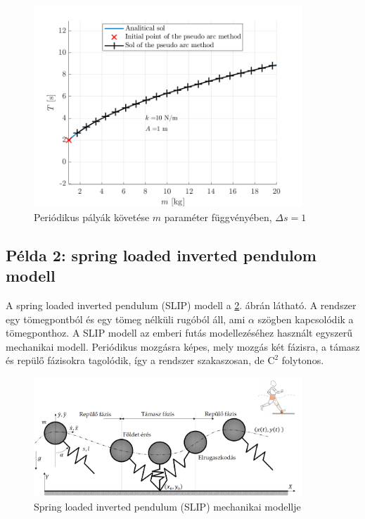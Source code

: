 \begin{figure}[ht]
	\centering
	\includegraphics[width=0.9\textwidth]{graphics/pszeudo_tomeg_rugo_m}
	\caption{Periódikus pályák követése $m$ paraméter függvényében, $\Delta s = 1$}\label{fig:pszeudo_tomeg_rugo_m}
\end{figure}

\subsection{Példa 2: spring loaded inverted pendulom modell}

A spring loaded inverted pendulum (SLIP) modell a \ref{fig:SLIP_mechanikai_modell}. ábrán látható.
A rendszer egy tömegpontból és egy tömeg nélküli rugóból áll, ami $\alpha$ szögben kapcsolódik a tömegponthoz.
A SLIP modell az emberi futás modellezéséhez használt egyszerű mechanikai modell.
Periódikus mozgásra képes, mely mozgás két fázisra, a támasz és repülő fázisokra tagolódik, így a rendszer szakaszosan, de $\mathrm{C}^2$ folytonos.

\begin{figure}[ht]
	\centering
	\includegraphics[width=0.9\textwidth]{graphics/slip_mozgas}
	\caption{Spring loaded inverted pendulum (SLIP) mechanikai modellje}\label{fig:SLIP_mechanikai_modell}
\end{figure}

